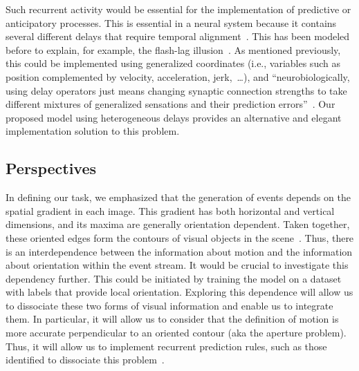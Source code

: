 \documentclass[default]{sn-jnl}%
\theoremstyle{thmstyleone}%
\theoremstyle{thmstyletwo}%
\theoremstyle{thmstylethree}%
\newcommand{\note}[1]{{\sethlcolor{yellow}\hl{#1}}}
\begin{document}
Such recurrent activity would be essential for the implementation of predictive or anticipatory processes. This is essential in a neural system because it contains several different delays that require temporal alignment~\citep{hogendoorn_predictive_2019}. This has been modeled before to explain, for example, the flash-lag illusion~\citep{khoei_flash-lag_2017}. %
As mentioned previously, this could be implemented using generalized coordinates (i.e., variables such as position complemented by velocity, acceleration, jerk,~\ldots), and ``neurobiologically, using delay operators just means changing synaptic connection strengths to take different mixtures of generalized sensations and their prediction errors''~\citep{perrinet_active_2014}. Our proposed model using heterogeneous delays provides an alternative and elegant implementation solution to this problem.
%
\subsection{Perspectives}
In defining our task, we emphasized that the generation of events depends on the spatial gradient in each image. This gradient has both horizontal and vertical dimensions, and its maxima are generally orientation dependent. Taken together, these oriented edges form the contours of visual objects in the scene~\citep{koenderink_representation_1987}. Thus, there is an interdependence between the information about motion and the information about orientation within the event stream. It would be crucial to investigate this dependency further. This could be initiated by training the model on a dataset with labels that provide local orientation. %
Exploring this dependence will allow us to dissociate these two forms of visual information and enable us to integrate them. In particular, it will allow us to consider that the definition of motion is more accurate perpendicular to an oriented contour (aka the aperture problem). Thus, it will allow us to implement recurrent prediction rules, such as those identified to dissociate this problem~\citep{perrinet_motion-based_2012}.
\end{document}
